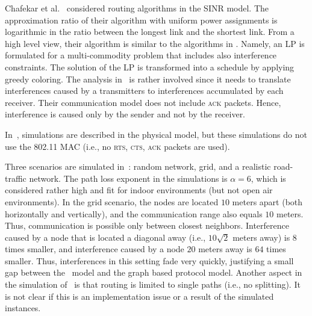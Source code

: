\documentclass[12pt]{article}
\newenvironment{proof sketch}[1]{\noindent {\emph{Proof sketch of #1:}}}{\hfill \qed}
\newcommand{\SINR}{\text{\sc{sinr}}}
\begin{document}
Chafekar et al.~\cite{ChafekarCapacity,chafekarPhD} considered routing
algorithms in the SINR model. The approximation ratio of their
algorithm with uniform power assignments is logarithmic in the ratio
between the longest link and the shortest link. From a high level
view, their algorithm is similar to the algorithms in
\cite{kumar2005algorithmic,alicherry2005joint11,buragohain2007improved}.
Namely, an LP is formulated for a multi-commodity problem that
includes also interference constraints. The solution of the LP is
transformed into a schedule by applying greedy coloring. The analysis
in~\cite{ChafekarCapacity} is rather involved since it needs to
translate interferences caused by a transmitters to interferences
accumulated by each receiver.
Their communication model does not include \textsc{ack} packets.
Hence, interference is caused only by the sender and not by the
receiver.

In~\cite{chafekarPhD}, simulations are described in the physical
model, but these simulations do not use the 802.11 MAC (i.e., no
\textsc{rts, cts, ack} packets are used).

Three scenarios are simulated in~\cite{chafekarPhD}: random network,
grid, and a realistic road-traffic network. The path loss exponent in
the simulations is $\alpha=6$, which is considered rather high and fit
for indoor environments (but not open air environments). In the grid
scenario, the nodes are located $10$ meters apart (both horizontally
and vertically), and the communication range also equals $10$ meters.
Thus, communication is possible only between closest neighbors.
Interference caused by a node that is located a diagonal away (i.e., $10\sqrt{2}$
meters away) is $8$ times smaller, and interference caused by a node
$20$ meters away is $64$ times smaller. Thus, interferences in this
setting fade very quickly, justifying a small gap between the \SINR\
model and the graph based protocol model. Another aspect in the
simulation of~\cite{chafekarPhD} is that routing is limited to single
paths (i.e., no splitting). It is not clear if this is an
implementation issue or a result of the simulated instances.
\end{document}
